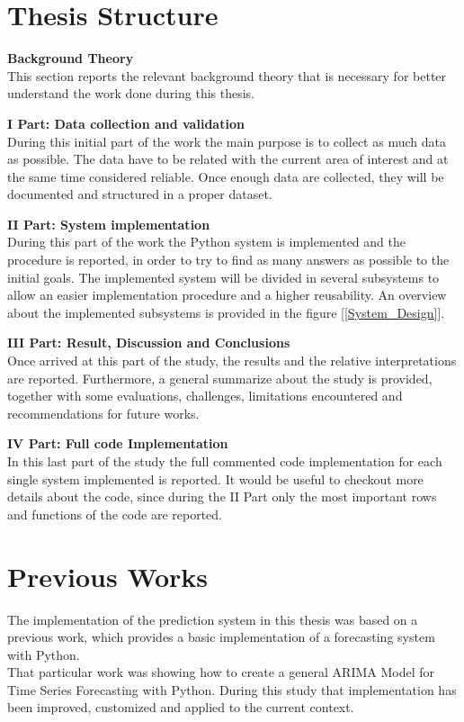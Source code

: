 \newpage

\section{Thesis Structure}
\label{Thesis_Strucutre}
\textbf{Background Theory}\\
This section reports the relevant background theory that is necessary for better understand the work done during this thesis.

\textbf{I Part: Data collection and validation}\\
During this initial part of the work the main purpose is to collect as much data as possible. The data have to be related with the current area of interest and at the same time considered reliable. Once enough data are collected, they will be documented and structured in a proper dataset.


\textbf{II Part: System implementation}\\
During this part of the work the Python system is implemented and the procedure is reported, in order to try to find as many answers as possible to the initial goals. The implemented system will be divided in several subsystems to allow an easier implementation procedure and a higher reusability. An overview about the implemented subsystems is provided in the figure [\ref{System_Design}].


\textbf{III Part: Result, Discussion and Conclusions }\\
Once arrived at this part of the study, the results and the relative interpretations are reported. Furthermore, a general summarize about the study is provided, together with some evaluations, challenges, limitations encountered and recommendations for future works.


\textbf{IV Part: Full code Implementation }	\\
In this last part of the study the full commented code implementation for each single system implemented is reported. It would be useful to checkout more details about the code, since during the II Part only the most important rows and functions of the code are reported.


\section{Previous Works}
\vspace{-5mm}
The implementation of the prediction system in this thesis was based on a previous work, which provides a basic implementation of a forecasting system with Python.\\
That particular work was showing how to create a general ARIMA Model for Time Series Forecasting with Python. During this study that implementation has been improved, customized and applied to the current context.


